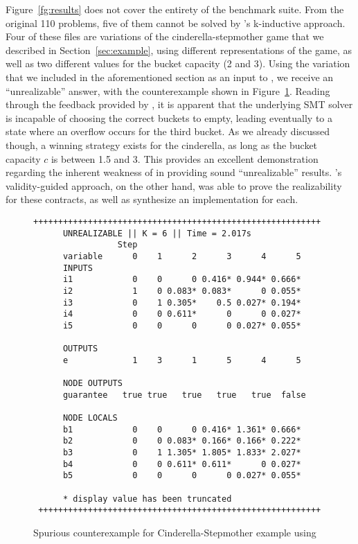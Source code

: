  

Figure~\ref{fg:results} does not cover the entirety of the
benchmark suite. From the original 110 problems, five of them cannot be
solved by \jsyn's k-inductive approach. Four of these files are variations of
the cinderella-stepmother game that we described in Section~\ref{sec:example}, using different representations of the game, as well as two different values
for the bucket capacity (2 and 3). Using the variation that we included in the
aforementioned section as an input to \jsyn, we receive an ``unrealizable'' answer, with the counterexample shown
in Figure~\ref{fg:cex}. Reading through the feedback provided by \jsyn, it is
apparent that the underlying SMT solver is incapable of choosing the correct
buckets to empty, leading eventually to a state where an overflow occurs for the
third bucket. As we already discussed though, a winning strategy exists for the
cinderella, as long as the bucket capacity $c$ is between 1.5 and 3. This
provides an excellent demonstration regarding the inherent weakness of \jsyn
in providing sound ``unrealizable'' results. \jsynvg's validity-guided approach,
on the other hand, was able to prove the realizability for these contracts, as
well as synthesize an implementation for each.

\begin{figure}[!t]
\centering
 \begin{Verbatim}[fontsize=\scriptsize]
 ++++++++++++++++++++++++++++++++++++++++++++++++++++++++++
      UNREALIZABLE || K = 6 || Time = 2.017s
                 Step
      variable      0    1      2      3      4      5
      INPUTS
      i1            0    0      0 0.416* 0.944* 0.666*
      i2            1    0 0.083* 0.083*      0 0.055*
      i3            0    1 0.305*    0.5 0.027* 0.194*
      i4            0    0 0.611*      0      0 0.027*
      i5            0    0      0      0 0.027* 0.055*

      OUTPUTS
      e             1    3      1      5      4      5

      NODE OUTPUTS
      guarantee   true true   true   true   true  false

      NODE LOCALS
      b1            0    0      0 0.416* 1.361* 0.666*
      b2            0    0 0.083* 0.166* 0.166* 0.222*
      b3            0    1 1.305* 1.805* 1.833* 2.027*
      b4            0    0 0.611* 0.611*      0 0.027*
      b5            0    0      0      0 0.027* 0.055*

      * display value has been truncated
 +++++++++++++++++++++++++++++++++++++++++++++++++++++++++
 \end{Verbatim}
\caption{Spurious counterexample for Cinderella-Stepmother example using \jsyn}

\label{fg:cex}
\end{figure}

